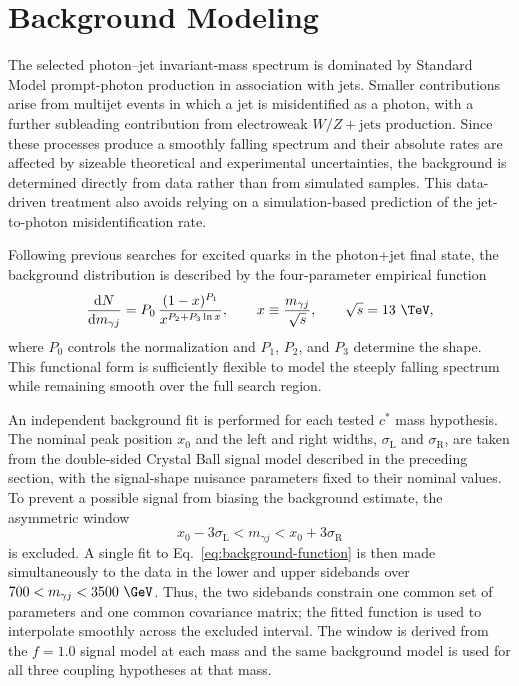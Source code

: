 \section{Background Modeling}
\label{sec:background-modeling}

The selected photon--jet invariant-mass spectrum is dominated by Standard
Model prompt-photon production in association with jets.  Smaller
contributions arise from multijet events in which a jet is misidentified as a
photon, with a further subleading contribution from electroweak
$W/Z+\mathrm{jets}$ production.  Since these processes produce a smoothly
falling spectrum and their
absolute rates are affected by sizeable theoretical and experimental
uncertainties, the background is determined directly from data rather than
from simulated samples.  This data-driven treatment also avoids relying on a
simulation-based prediction of the jet-to-photon misidentification rate.

Following previous searches for excited quarks in the photon+jet final state,
the background distribution is described by the four-parameter empirical
function
\begin{equation}
  \frac{\mathrm{d}N}{\mathrm{d}m_{\gamma j}}
  = P_{0}\,
    \frac{(1-x)^{P_{1}}}
         {x^{P_{2}+P_{3}\ln x}},
  \qquad
  x \equiv \frac{m_{\gamma j}}{\sqrt{s}},
  \qquad \sqrt{s}=13~\TeV ,
  \label{eq:background-function}
\end{equation}
where $P_{0}$ controls the normalization and $P_{1}$, $P_{2}$, and $P_{3}$
determine the shape.  This functional form is sufficiently flexible to model
the steeply falling spectrum while remaining smooth over the full search
region.

An independent background fit is performed for each tested $c^{*}$ mass
hypothesis.  The nominal peak position $x_{0}$ and the left and right widths,
$\sigma_{\mathrm{L}}$ and $\sigma_{\mathrm{R}}$, are taken from the
double-sided Crystal Ball signal model described in the preceding section,
with the signal-shape nuisance parameters fixed to their nominal values.  To
prevent a possible signal from biasing the
background estimate, the asymmetric window
\begin{equation}
  x_{0}-3\sigma_{\mathrm{L}}
  < m_{\gamma j} <
  x_{0}+3\sigma_{\mathrm{R}}
  \label{eq:background-excluded-window}
\end{equation}
is excluded.  A single fit to Eq.~\eqref{eq:background-function} is then made
simultaneously to the data in the lower and upper sidebands over
$700 < m_{\gamma j} < 3500~\GeV$.  Thus, the two sidebands constrain one common
set of parameters and one common covariance matrix; the fitted function is
used to interpolate smoothly across the excluded interval.  The window is
derived from the $f=1.0$ signal model at each mass and the same background
model is used for all three coupling hypotheses at that mass.

